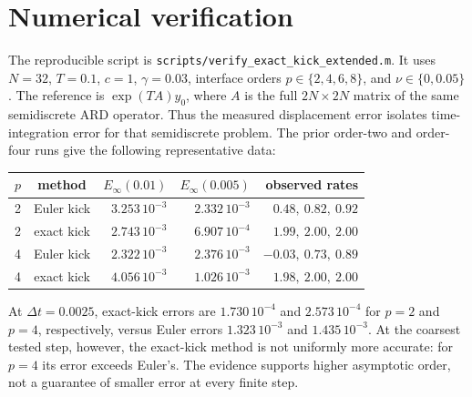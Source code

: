 \documentclass[10pt]{article}
\begin{document}
\section{Numerical verification}
The reproducible script is \texttt{scripts/verify\_exact\_kick\_extended.m}.
It uses $N=32$, $T=0.1$, $c=1$, $\gamma=0.03$, interface orders
$p\in\{2,4,6,8\}$, and $\nu\in\{0,0.05\}$. The reference is
$\exp(TA)y_0$, where $A$ is the full $2N\times2N$ matrix of the same
semidiscrete ARD operator. Thus the measured displacement error isolates
time-integration error for that semidiscrete problem. The prior order-two
and order-four runs give the following representative data:
\begin{center}
\begin{tabular}{ccrrr}
\toprule
$p$ & method & $E_{\infty}(0.01)$ & $E_{\infty}(0.005)$ & observed rates\\
\midrule
2 & Euler kick & $3.253\,10^{-3}$ & $2.332\,10^{-3}$ & $0.48,\ 0.82,\ 0.92$\\
2 & exact kick & $2.743\,10^{-3}$ & $6.907\,10^{-4}$ & $1.99,\ 2.00,\ 2.00$\\
4 & Euler kick & $2.322\,10^{-3}$ & $2.376\,10^{-3}$ & $-0.03,\ 0.73,\ 0.89$\\
4 & exact kick & $4.056\,10^{-3}$ & $1.026\,10^{-3}$ & $1.98,\ 2.00,\ 2.00$\\
\bottomrule
\end{tabular}
\end{center}
At $\Delta t=0.0025$, exact-kick errors are $1.730\,10^{-4}$ and
$2.573\,10^{-4}$ for $p=2$ and $p=4$, respectively, versus Euler errors
$1.323\,10^{-3}$ and $1.435\,10^{-3}$. At the coarsest tested step,
however, the exact-kick method is not uniformly more accurate: for $p=4$
its error exceeds Euler's. The evidence supports higher asymptotic order,
not a guarantee of smaller error at every finite step.
\end{document}
